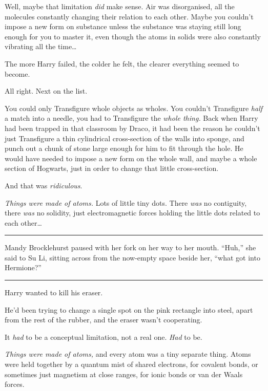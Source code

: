 Well, maybe that limitation \emph{did} make sense. Air was disorganised,
all the molecules constantly changing their relation to each other.
Maybe you couldn't impose a new form on substance unless the substance
was staying still long enough for you to master it, even though the
atoms in solids were also constantly vibrating all the time\ldots{}

The more Harry failed, the colder he felt, the clearer everything seemed
to become.

All right. Next on the list.

You could only Transfigure whole objects as wholes. You couldn't
Transfigure \emph{half} a match into a needle, you had to Transfigure
the \emph{whole thing.} Back when Harry had been trapped in that
classroom by Draco, it had been the reason he couldn't just Transfigure
a thin cylindrical cross-section of the walls into sponge, and punch out
a chunk of stone large enough for him to fit through the hole. He would
have needed to impose a new form on the whole wall, and maybe a whole
section of Hogwarts, just in order to change that little cross-section.

And that was \emph{ridiculous}.

\emph{Things were made of atoms.} Lots of little tiny dots. There
\emph{was} no contiguity, there \emph{was} no solidity, just
electromagnetic forces holding the little dots related to each
other\ldots{}

\begin{center}\rule{3in}{0.4pt}\end{center}

Mandy Brocklehurst paused with her fork on her way to her mouth.
``Huh,'' she said to Su Li, sitting across from the now-empty space
beside her, ``what got into Hermione?''

\begin{center}\rule{3in}{0.4pt}\end{center}

Harry wanted to kill his eraser.

He'd been trying to change a single spot on the pink rectangle into
steel, apart from the rest of the rubber, and the eraser wasn't
cooperating.

It \emph{had} to be a conceptual limitation, not a real one. \emph{Had}
to be.

\emph{Things were made of atoms,} and every atom was a tiny separate
thing. Atoms were held together by a quantum mist of shared electrons,
for covalent bonds, or sometimes just magnetism at close ranges, for
ionic bonds or van der Waals forces.

